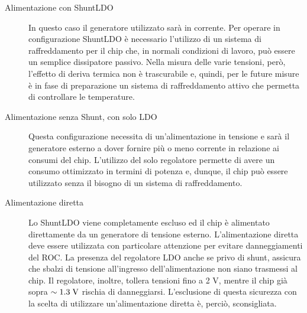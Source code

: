 \begin{description}
\item[Alimentazione con ShuntLDO] In questo caso il generatore utilizzato sarà in corrente. Per operare in configurazione ShuntLDO è necessario l'utilizzo di un sistema di raffreddamento per il chip che, in normali condizioni di lavoro, può essere un semplice dissipatore passivo. Nella misura delle varie tensioni, però, l'effetto di deriva termica non è trascurabile e, quindi, per le future misure \`e in fase di preparazione un sistema di raffreddamento attivo che permetta di controllare le temperature.

\item[Alimentazione senza Shunt, con solo LDO] Questa configurazione necessita di un'alimentazione in tensione e sarà il generatore esterno a dover fornire più o meno corrente in relazione ai consumi del chip. L'utilizzo del solo regolatore permette di avere un consumo ottimizzato in termini di potenza e, dunque, il chip pu\`o essere utilizzato senza il bisogno di un sistema di raffreddamento.

\item[Alimentazione diretta] Lo ShuntLDO viene completamente escluso ed il chip è alimentato direttamente da un generatore di tensione esterno. L'alimentazione diretta deve essere utilizzata con particolare attenzione per evitare danneggiamenti del ROC. La presenza del regolatore LDO anche se privo di shunt, assicura che sbalzi di tensione all'ingresso dell'alimentazione non siano trasmessi al chip. Il regolatore, inoltre, tollera tensioni fino a 2 V, mentre il chip già sopra $\sim 1.3\rm \; V$ rischia di danneggiarsi. L'esclusione di questa sicurezza con la scelta di utilizzare un'alimentazione diretta è, perciò, sconsigliata. 
\end{description}

